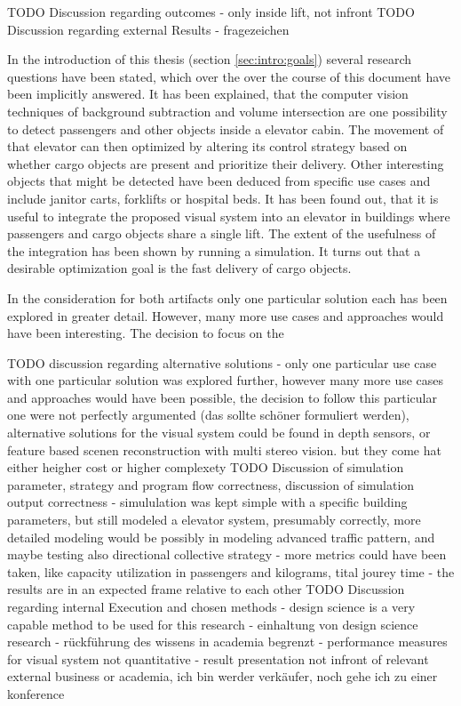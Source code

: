 TODO Discussion regarding outcomes
- only inside lift, not infront
TODO Discussion regarding external Results 
- fragezeichen

In the introduction of this thesis (section \ref{sec:intro:goals}) several research questions have been stated,
which over the over the course of this document have been implicitly answered.
It has been explained, that the computer vision techniques of background subtraction and volume intersection are one possibility to detect passengers and other objects inside a elevator cabin. The movement of that elevator can then optimized by altering its control strategy based on whether cargo objects are present and prioritize their delivery.
Other interesting objects that might be detected have been deduced from specific use cases and include janitor carts, forklifts or hospital beds.
It has been found out, 
that it  is useful to integrate the proposed visual system into an elevator in buildings where passengers and cargo objects share a single lift.
The extent of the usefulness of the integration has been shown by running a simulation. 
It turns out that a desirable optimization goal is the fast delivery of cargo objects.

In the consideration for both artifacts only one particular solution each has been explored in greater detail.
However, many more use cases and approaches would have been interesting.
The decision to focus on the 

TODO discussion regarding alternative solutions
 - only one particular use case with one particular solution was explored further, however many more use cases and approaches would have been possible, the decision to follow this particular one were not perfectly argumented (das sollte schöner formuliert werden), alternative solutions for the visual system could be found in depth sensors, or feature based scenen reconstruction with multi stereo vision. but they come hat either heigher cost or higher complexety
TODO Discussion of simulation parameter, strategy and program flow correctness, discussion of simulation output correctness
- simululation was kept simple with a specific building parameters, but still modeled a elevator system, presumably correctly, more detailed modeling would be possibly in modeling advanced traffic pattern, and maybe testing also directional collective strategy
- more metrics could have been taken, like capacity utilization in passengers and kilograms, tital jourey time
- the results are in an expected frame relative to each other
TODO  Discussion regarding internal Execution and chosen methods 
- design science is a very capable method to be used for this research
- einhaltung von design science research - rückführung des wissens in academia begrenzt
- performance measures for visual system not quantitative
- result presentation not infront of relevant external business or academia, ich bin werder verkäufer, noch gehe ich zu einer konference

